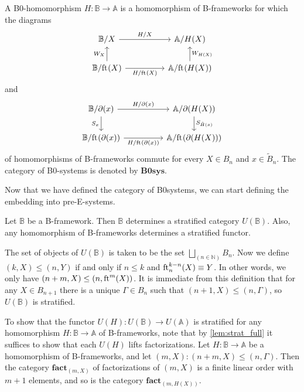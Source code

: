 \begin{defn}
A B0-homomorphism $H:\mathbb{B}\to\mathbb{A}$ is a homomorphism of B-frameworks
for which the diagrams
\begin{equation*}
\begin{tikzcd}[column sep=huge]
\mathbb{B}/X \arrow[r,"H/X"] & \mathbb{A}/H(X) \\
\mathbb{B}/\eft(X) \arrow[u,"W_X"] \arrow[r,swap,"H/\eft(X)"] & \mathbb{A}/\eft(H(X)) \arrow[u,swap,"W_{H(X)}"]
\end{tikzcd}
\end{equation*}
and
\begin{equation*}
\begin{tikzcd}[column sep=huge]
\mathbb{B}/\ebd(x) \arrow[r,"H/\ebd(x)"] \arrow[d,swap,"S_x"] & \mathbb{A}/\ebd(H(X)) \arrow[d,"S_{\tilde{H}(x)}"] \\
\mathbb{B}/\eft(\ebd(x)) \arrow[r,swap,"H/\eft(\ebd(x))"] & \mathbb{A}/\eft(\ebd(H(X)))
\end{tikzcd}
\end{equation*}
of homomorphisms of B-frameworks commute for every 
$X\in B_n$ and $x\in\tilde{B}_n$. The category of B0-systems is denoted
by $\mathbf{B0sys}$.
\end{defn}

Now that we have defined the category of B0systems, we can start defining the
embedding into pre-E-systems.

\begin{defn}
Let $\mathbb{B}$ be a B-framework. Then $\mathbb{B}$ determines
a stratified category $U(\mathbb{B})$. Also, any homomorphism of B-frameworks
determines a stratified functor.
\end{defn}

\begin{constr}
The set of objects of $U(\mathbb{B})$ is taken to be the set
$\bigsqcup_{(n\in\mathbb{N})}B_n$. Now we define
$(k,X)\leq (n,Y)$ if and only if $n\leq k$ and $\eft[n]^{k-n}(X)\jdeq Y$.
In other words, we only have $(n+m,X)\leq (n,\eft^m(X))$. It is immediate from
this definition that for any $X\in B_{n+1}$ there is a unique $\Gamma\in
B_n$ such that $(n+1,X)\leq (n,\Gamma)$, so $U(\mathbb{B})$ is stratified.

To show that the functor $U(H):U(\mathbb{B})\to U(\mathbb{A})$ is stratified for
any homomorphism $H:\mathbb{B}\to\mathbb{A}$ of B-frameworks, note that
by \autoref{lem:strat_full} it suffices to show that each $U(H)$ 
lifts factorizations.
Let $H:\mathbb{B}\to\mathbb{A}$ be a homomorphism of B-frameworks, and let
$(m,X):(n+m,X)\leq (n,\Gamma)$. Then the category $\mathbf{fact}_{(m,X)}$ of
factorizations of $(m,X)$ is a finite linear order with
$m+1$ elements, and so is the category $\mathbf{fact}_{(m,H(X))}$. 
\end{constr}

